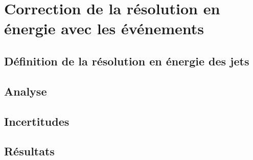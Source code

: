 \section{Correction de la résolution en énergie avec les événements \Gjet}\label{chapter-JERC-section-JER}

\subsection{Définition de la résolution en énergie des jets}\label{chapter-JERC-section-JER-subsec-JER_definition}

\subsection{Analyse}\label{chapter-JERC-section-JER-subsec-analyse}

\subsection{Incertitudes}\label{chapter-JERC-section-JER-subsec-uncertainties}

\subsection{Résultats}\label{chapter-JERC-section-JER-subsec-results}
